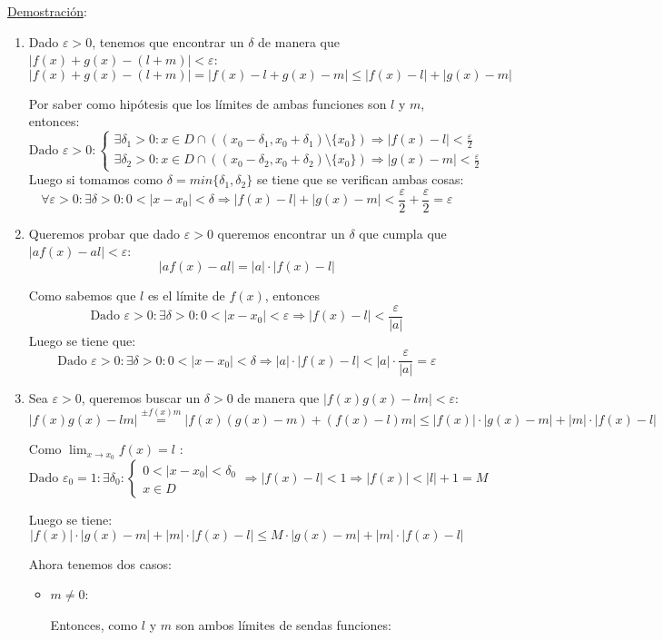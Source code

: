 \documentclass[10pt,a4paper,openright]{book}
\begin{document}
\underline{Demostración}:
\begin{enumerate}
\item Dado $\varepsilon>0$, tenemos que encontrar un $\delta$ de manera que $|f(x)+g(x)-(l+m)|<\varepsilon$:
$$|f(x)+g(x)-(l+m)|=|f(x)-l+g(x)-m|\leq |f(x)-l|+|g(x)-m|$$

Por saber como hipótesis que los límites de ambas funciones son $l$ y $m$, entonces:
$$\mbox{Dado }\varepsilon>0:\begin{cases} \exists \delta_1>0: x\in D\cap \left((x_0-\delta_1, x_0+\delta_1)\mbox{\textbackslash}\{x_0\}\right)\Rightarrow |f(x)-l|<\frac{\varepsilon}{2}\\ \exists \delta_2>0: x\in D\cap \left((x_0-\delta_2, x_0+\delta_2)\mbox{\textbackslash}\{x_0\}\right)\Rightarrow |g(x)-m|<\frac{\varepsilon}{2}\end{cases}$$
Luego si tomamos como $\delta=min\{\delta_1,\delta_2\}$ se tiene que se verifican ambas cosas:
$$\forall \varepsilon>0: \exists \delta>0: 0<|x-x_0|<\delta\Rightarrow |f(x)-l|+|g(x)-m|<\frac{\varepsilon}{2}+\frac{\varepsilon}{2}=\varepsilon$$

\item Queremos probar que dado $\varepsilon>0$ queremos encontrar un $\delta$ que cumpla que $|af(x)-al|<\varepsilon$:
$$|af(x)-al|=|a|\cdot |f(x)-l|$$

Como sabemos que $l$ es el límite de $f(x)$, entonces
$$\mbox{Dado }\varepsilon>0: \exists \delta>0: 0<|x-x_0|<\varepsilon\Rightarrow |f(x)-l|<\frac{\varepsilon}{|a|}$$
Luego se tiene que:
$$\mbox{Dado }\varepsilon>0: \exists \delta>0: 0<|x-x_0|<\delta\Rightarrow |a|\cdot |f(x)-l|< |a|\cdot \frac{\varepsilon}{|a|}=\varepsilon$$

\item Sea $\varepsilon>0$, queremos buscar un $\delta>0$ de manera que $|f(x)g(x)-lm|<\varepsilon$:
$$|f(x)g(x)-lm|\stackrel{\pm f(x)m}{=}|f(x)\left(g(x)-m\right)+\left(f(x)-l\right)m|\leq |f(x)|\cdot |g(x)-m|+|m|\cdot |f(x)-l|$$

Como $\lim_{x\rightarrow x_0}f(x)=l$ :
$$\mbox{Dado }\varepsilon_0=1: \exists \delta_0: \begin{cases} 0<|x-x_0|<\delta_0 \\ x\in D \end{cases}\Rightarrow |f(x)-l|<1\Rightarrow |f(x)|<|l|+1=M$$

Luego se tiene:
$$|f(x)|\cdot |g(x)-m|+|m|\cdot |f(x)-l|\leq M\cdot |g(x)-m|+|m|\cdot |f(x)-l|$$

Ahora tenemos dos casos:
\begin{itemize}
\item $m\neq 0$:\par
	Entonces, como $l$ y $m$ son ambos límites de sendas funciones:
	

\end{itemize}
\end{enumerate}
\end{document}
